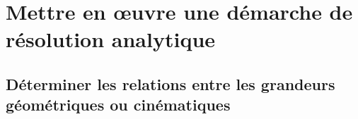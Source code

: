 \section{Mettre en œuvre une démarche de résolution analytique}
\subsection{Déterminer les relations entre les grandeurs géométriques ou cinématiques}
\proftrue
\renewcommand{\repExo}{../../ExercicesCompetences/C2_MettreEnOeuvreDemarche/C2_06_DeterminerLoisES}

\renewcommand{\td}{10_PompePalette}
\graphicspath{{\repStyle/png/}{\repExo/\td/images/}}


\renewcommand{\td}{11_PompePistonsRadiaux}
\graphicspath{{\repStyle/png/}{\repExo/\td/images/}}


\renewcommand{\td}{12_BielleManivelle}
\graphicspath{{\repStyle/png/}{\repExo/\td/images/}}


\renewcommand{\td}{13_TransfoMouvement}
\graphicspath{{\repStyle/png/}{\repExo/\td/images/}}


\renewcommand{\td}{14_Sympact}
\graphicspath{{\repStyle/png/}{\repExo/\td/images/}}


\renewcommand{\td}{15_SympactGalet}
\graphicspath{{\repStyle/png/}{\repExo/\td/images/}}


\renewcommand{\td}{16_Poussoir}
\graphicspath{{\repStyle/png/}{\repExo/\td/images/}}


\renewcommand{\td}{17_4Barres}
\graphicspath{{\repStyle/png/}{\repExo/\td/images/}}


\renewcommand{\td}{18_Maxpid}
\graphicspath{{\repStyle/png/}{\repExo/\td/images/}}


\renewcommand{\td}{19_Graham}
\graphicspath{{\repStyle/png/}{\repExo/\td/images/}}


\renewcommand{\td}{20_VariateurBilles}
\graphicspath{{\repStyle/png/}{\repExo/\td/images/}}


